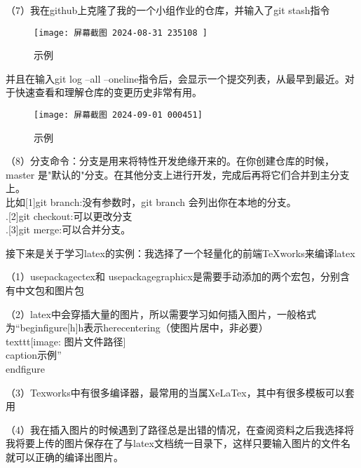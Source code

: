 \documentclass[11pt]{article} %
\begin{document}
（7）我在github上克隆了我的一个小组作业的仓库，并输入了git stash指令
\begin{figure}[htbp] %
  \centering%
    \texttt{[image: 屏幕截图 2024-08-31 235108 ]}
\caption{示例}
\end{figure}
并且在输入git log --all --oneline指令后，会显示一个提交列表，从最早到最近。对于快速查看和理解仓库的变更历史非常有用。
  
\begin{figure}[htbp] %
  \centering%
  \texttt{[image: 屏幕截图 2024-09-01 000451]} %
  \caption{示例}
\end{figure}

（8）分支命令：分支是用来将特性开发绝缘开来的。在你创建仓库的时候，master 是"默认的"分支。在其他分支上进行开发，完成后再将它们合并到主分支上。\\
比如[1]git branch:没有参数时，git branch 会列出你在本地的分支。\\.[2]git checkout:可以更改分支 \\.[3]git merge:可以合并分支。

接下来是关于学习latex的实例：我选择了一个轻量化的前端TeXworks来编译latex

（1）usepackage{ctex}和 usepackage{graphicx}是需要手动添加的两个宏包，分别含有中文包和图片包

（2）latex中会穿插大量的图片，所以需要学习如何插入图片，一般格式为“begin{figure}[h]h表示herecentering（使图片居中，非必要）\\texttt{[image: 图片文件路径]}\\caption{示例}”\\end{figure}

（3）Texworks中有很多编译器，最常用的当属XeLaTex，其中有很多模板可以套用

（4）我在插入图片的时候遇到了路径总是出错的情况，在查阅资料之后我选择将我将要上传的图片保存在了与latex文档统一目录下，这样只要输入图片的文件名就可以正确的编译出图片。
\end{document}
